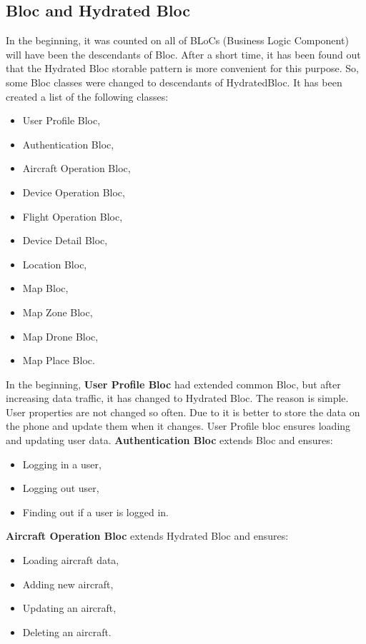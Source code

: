 \subsection{Bloc and Hydrated Bloc}\label{subsec:bloc-and-hydrated-bloc}
In the beginning, it was counted on all of BLoCs (Business Logic Component) will have been the descendants of Bloc.
After a short time, it has been found out that the Hydrated Bloc storable pattern is more convenient for this purpose.
So, some Bloc classes were changed to descendants of HydratedBloc.
It has been created a list of the following classes:
\begin{itemize}
    \item User Profile Bloc,
    \item Authentication Bloc,
    \item Aircraft Operation Bloc,
    \item Device Operation Bloc,
    \item Flight Operation Bloc,
    \item Device Detail Bloc,
    \item Location Bloc,
    \item Map Bloc,
    \item Map Zone Bloc,
    \item Map Drone Bloc,
    \item Map Place Bloc.
\end{itemize}
In the beginning, \textbf{User Profile Bloc} had extended common Bloc, but after increasing data traffic, it has changed to Hydrated Bloc.
The reason is simple.
User properties are not changed so often.
Due to it is better to store the data on the phone and update them when it changes.
User Profile bloc ensures loading and updating user data.
\newline
\newline
\newline
\textbf{Authentication Bloc} extends Bloc and ensures:
\begin{itemize}
    \item Logging in a user,
    \item Logging out user,
    \item Finding out if a user is logged in.
\end{itemize}
\textbf{Aircraft Operation Bloc} extends Hydrated Bloc and ensures:
\begin{itemize}
    \item Loading aircraft data,
    \item Adding new aircraft,
    \item Updating an aircraft,
    \item Deleting an aircraft.
\end{itemize}
